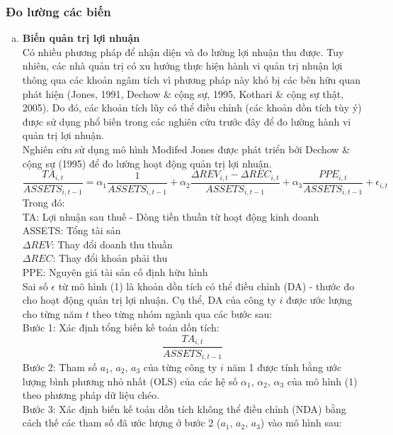 \documentclass[a4paper]{article}
\begin{document}
\subsubsection{Đo lường các biến}
\begin{enumerate}[a)]
\item\textbf{Biến quản trị lợi nhuận}\\
Có nhiều phương pháp để nhận diện và đo lường lợi nhuận thu được. Tuy nhiên, các nhà quản trị có xu hướng thực hiện hành vi quản trị nhuận lợi thông qua các khoản ngâm tích vì phương pháp này khó bị các bên hữu quan phát hiện (Jones, 1991, Dechow \& cộng sự, 1995, Kothari \& cộng sự thật, 2005). Do đó, các khoản tích lũy có thể điều chỉnh (các khoản dồn tích tùy ý) được sử dụng phổ biến trong các nghiên cứu trước đây để đo lường hành vi quản trị lợi nhuận.\\Nghiên  cứu  sử dụng  mô  hình  Modifed Jones được phát triển bởi Dechow \& cộng sự (1995) \cite{8} để đo lường hoạt động quản trị lợi nhuận.\\
\begin{equation}
\frac{TA_{i,t}}{ASSETS_{i,t-1}} = \alpha_1 \frac{1}{ASSETS_{i,t-1}} + \alpha_2 \frac{\Delta REV_{i,t} - \Delta REC_{i,t}}{ASSETS_{i,t-1}} + \alpha_3 \frac{PPE_{i,t}}{ASSETS_{i,t-1}} + \epsilon_{i,t}
\end{equation}
Trong đó: \\
TA: Lợi nhuận sau thuế - Dòng tiền thuần từ hoạt động kinh doanh \\
ASSETS: Tổng tài sản \\
$\Delta REV$: Thay đổi doanh thu thuần \\
$\Delta REC$: Thay đổi khoản phải thu \\
PPE: Nguyên giá tài sản cố định hữu hình \\
Sai số $\epsilon$ từ mô hình (1) là khoản dồn tích có thể điều chỉnh (DA) - thước đo cho hoạt động quản trị lợi nhuận. Cụ thể, DA của công ty $i$ được ước lượng cho từng năm $t$ theo từng nhóm ngành qua các bước sau:\\
Bước 1: Xác định tổng biến kế toán dồn tích:\\
\begin{equation}
\frac{TA_{i,t}}{ASSETS_{i,t-1}}
\end{equation}
Bước 2: Tham số $a_1$, $a_2$, $a_3$ của từng công ty $i$ năm 1 được tính bằng ước lượng bình phương nhỏ nhất (OLS) của các hệ số $\alpha_1$, $\alpha_2$, $\alpha_3$ của mô hình (1) theo phương pháp dữ liệu chéo.\\
Bước 3: Xác định biến kế toán dồn tích không thể điều chỉnh (NDA) bằng cách thế các tham số đã ước lượng ở bước 2 ($a_1$, $a_2$, $a_3$) vào mô hình sau:\\

\end{enumerate}
\end{document}
